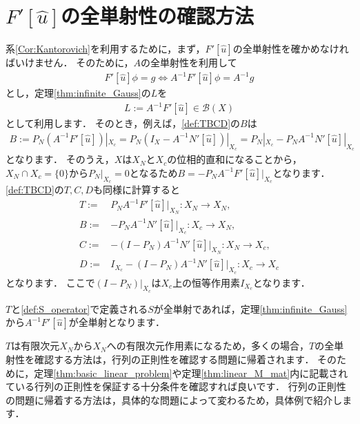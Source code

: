 \section{\texorpdfstring{$F'[\hat{u}]$}{F'[u-hat]}の全単射性の確認方法}\label{sec:check_biject}
系\ref{Cor:Kantorovich}を利用するために，まず，$F'[\hat{u}]$の全単射性を確かめなければいけません．
そのために，$A$の全単射性を利用して
\begin{align*}
	F'[\hat{u}] \phi = g \Leftrightarrow A^{-1} F'[\hat{u}] \phi = A^{-1} g
\end{align*}
とし，定理\ref{thm:infinite_Gauss}の$L$を
\begin{align*}
	L := A^{-1} F'[\hat{u}] \in {\mathcal B}(X)
\end{align*}
として利用します．
そのとき，例えば，\eqref{def:TBCD}の$B$は
\begin{align*}
	B := P_N (A^{-1} F'[\hat{u}]) |_{X_c} = P_N (I_X - A^{-1} N'[\hat{u}]) |_{X_c} = P_N |_{X_c} - P_N A^{-1} N'[\hat{u}] |_{X_c}
\end{align*}
となります．
そのうえ，$X$は$X_N$と$X_c$の位相的直和になることから，$X_N \cap X_c = \{ 0 \}$から$P_N |_{X_c} = 0$となるため$B = -P_N A^{-1} F'[\hat{u}] |_{X_c}$となります．
\eqref{def:TBCD}の$T, C, D$も同様に計算すると
\begin{align*}
	T :=& P_N A^{-1} F'[\hat{u}] |_{X_N} : X_N \rightarrow X_N, \\
	B :=& - P_N A^{-1} N'[\hat{u}] |_{X_c} : X_c \rightarrow X_N, \\
	C :=& -(I - P_N) A^{-1} N'[\hat{u}] |_{X_N}: X_N \rightarrow X_c, \\
	D :=& I_{X_c} - (I - P_N) A^{-1} N'[\hat{u}] |_{X_c} : X_c \rightarrow X_c
\end{align*}
となります．
ここで$(I - P_N)|_{X_c}$は$X_c$上の恒等作用素$I_{X_c}$となります．

$T$と\eqref{def:S_operator}で定義される$S$が全単射であれば，定理\ref{thm:infinite_Gauss}から$A^{-1} F'[\hat{u}]$が全単射となります．

$T$は有限次元$X_N$から$X_N$への有限次元作用素になるため，多くの場合，$T$の全単射性を確認する方法は，行列の正則性を確認する問題に帰着されます．
そのために，定理\ref{thm:basic_linear_problem}や定理\ref{thm:linear_M_mat}内に記載されている行列の正則性を保証する十分条件を確認すれば良いです．
行列の正則性の問題に帰着する方法は，具体的な問題によって変わるため，具体例で紹介します．



